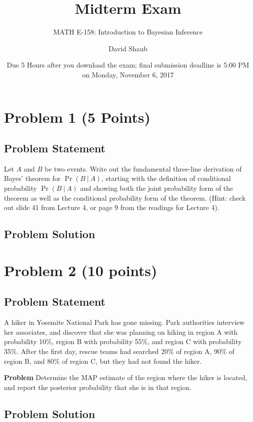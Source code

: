 \documentclass[12pt]{article}
\title{Midterm Exam}
\author{MATH E-158: Introduction to Bayesian Inference}
\author{David Shaub}
\date{Due 5 Hours after you download the exam; final submission deadline is 5:00 PM on Monday, November 6, 2017}
\theoremstyle{definition}
\begin{document}
	
	\maketitle


\section*{Problem 1 (5 Points)}


\subsection*{Problem Statement}

Let $A$ and $B$ be two events.
Write out the fundamental three-line derivation of Bayes' theorem for $\Pr(B\ |\ A)$, starting with the definition of conditional probability $\Pr(B\ |\ A)$ and showing both the joint probability form of the theorem as well as the conditional probability form of the theorem. (Hint: check out slide 41 from Lecture 4, or page 9 from the readings for Lecture 4).

\subsection*{Problem Solution}




\newpage
\section*{Problem 2 (10 points)}

\subsection*{Problem Statement}

A hiker in Yosemite National Park has gone missing. Park authorities interview her associates, and discover that she was planning on hiking in region A with probability 10\%, region B with probability 55\%, and region C with probability 35\%. After the first day, rescue teams had searched 20\% of region A, 90\% of region B, and 80\% of region C, but they had not found the hiker.

\bigskip
\noindent
{\bf Problem} Determine the MAP estimate of the region where the hiker is located, and report the posterior probability that she is in that region.

\subsection*{Problem Solution}
\end{document}
